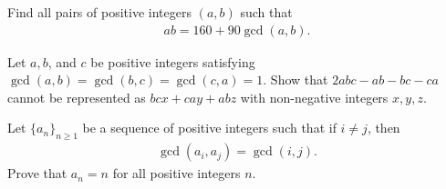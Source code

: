 \documentclass{subfile}
\begin{document}
	\begin{problem}
		Find all pairs of positive integers $(a, b)$ such that
			\begin{align*}
				ab=160 + 90 \gcd(a,b).
			\end{align*}
	\end{problem}


	\begin{problem}
		Let $a, b$, and $c$ be positive integers satisfying $\gcd (a, b) = \gcd (b, c) = \gcd (c, a) = 1$. Show that $2abc-ab-bc-ca$ cannot be represented as $bcx+cay +abz$ with non-negative integers $x, y, z$. %
	\end{problem}


	\begin{problem}
		Let $\{a_n\}_{n\geq 1}$ be a sequence of positive integers such that if $i \neq j$, then
			\begin{align*}
				\gcd(a_i,a_j)=\gcd(i,j).
			\end{align*}
		Prove that $a_n=n$ for all positive integers $n$. %
	\end{problem}

\end{document}

